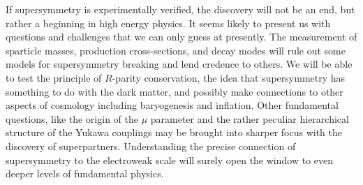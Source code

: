 \documentclass[12pt]{article}
\begin{document}
If supersymmetry is experimentally verified, the discovery will not be 
an end, but rather a beginning in high energy physics. It seems likely 
to present us with questions and challenges that we can only guess at 
presently. The measurement of sparticle masses, production 
cross-sections, and decay modes will rule out some models for 
supersymmetry breaking and lend credence to others. We will be able to 
test the principle of $R$-parity conservation, the idea that 
supersymmetry has something to do with the dark matter, and possibly 
make connections to other aspects of cosmology including baryogenesis 
and inflation. Other fundamental questions, like the origin of the $\mu$ 
parameter and the rather peculiar hierarchical structure of the Yukawa 
couplings may be brought into sharper focus with the discovery of 
superpartners. Understanding the precise connection of supersymmetry to 
the electroweak scale will surely open the window to even deeper levels 
of fundamental physics.


\end{document}
